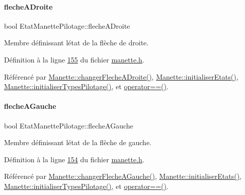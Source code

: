 \paragraph{\texorpdfstring{fleche\+A\+Droite}{flecheADroite}}
{\footnotesize\ttfamily bool Etat\+Manette\+Pilotage\+::fleche\+A\+Droite}



Membre définissant l\textquotesingle{}état de la flèche de droite. 



Définition à la ligne \hyperlink{manette_8h_source_l00155}{155} du fichier \hyperlink{manette_8h_source}{manette.\+h}.



Référencé par \hyperlink{manette_8cpp_source_l00542}{Manette\+::changer\+Fleche\+A\+Droite()}, \hyperlink{manette_8cpp_source_l00023}{Manette\+::initialiser\+Etats()}, \hyperlink{manette_8cpp_source_l00040}{Manette\+::initialiser\+Types\+Pilotage()}, et \hyperlink{manette_8cpp_source_l00613}{operator==()}.

\mbox{\label{struct_etat_manette_pilotage_aace02b9bb3feb3b618dd9133d4c5b87f}} 
\paragraph{\texorpdfstring{fleche\+A\+Gauche}{flecheAGauche}}
{\footnotesize\ttfamily bool Etat\+Manette\+Pilotage\+::fleche\+A\+Gauche}



Membre définissant l\textquotesingle{}état de la flèche de gauche. 



Définition à la ligne \hyperlink{manette_8h_source_l00154}{154} du fichier \hyperlink{manette_8h_source}{manette.\+h}.



Référencé par \hyperlink{manette_8cpp_source_l00533}{Manette\+::changer\+Fleche\+A\+Gauche()}, \hyperlink{manette_8cpp_source_l00023}{Manette\+::initialiser\+Etats()}, \hyperlink{manette_8cpp_source_l00040}{Manette\+::initialiser\+Types\+Pilotage()}, et \hyperlink{manette_8cpp_source_l00613}{operator==()}.

\mbox{\label{struct_etat_manette_pilotage_ab7cce4480358d2e7ac189e96ab04b894}} 
